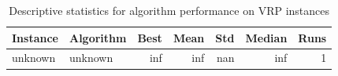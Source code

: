 \begin{table}[htbp]
\centering
\caption{Descriptive statistics for algorithm performance on VRP instances}
\label{tab:descriptive_stats}
\begin{tabular}{llrrrrr}
\toprule
Instance & Algorithm & Best & Mean & Std & Median & Runs \\
\midrule
unknown & unknown & inf & inf & nan & inf & 1 \\
\bottomrule
\end{tabular}
\end{table}
